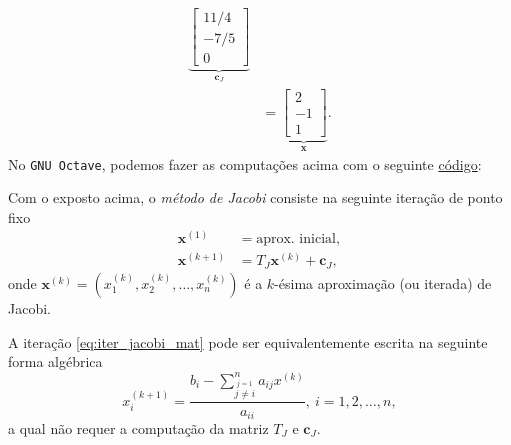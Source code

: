 \begin{ex}
\begin{align}
      \underbrace{\begin{bmatrix}
       11/4 \\
       -7/5 \\
       0
      \end{bmatrix}}_{\pmb{c}_J}\\
  &= \underbrace{\begin{bmatrix}
        2 \\
        -1 \\
        1             
      \end{bmatrix}}_{\pmb{x}}.
  \end{align}
\ifisoctave
No \verb+GNU Octave+, podemos fazer as computações acima com o seguinte \href{https://github.com/phkonzen/notas/blob/master/src/MatematicaNumerica/cap_sl_iter/dados/ex_jacobi_intro/ex_jacobi_intro.m}{código}:

\fi
\end{ex}

Com o exposto acima, o \emph{método de Jacobi} consiste na seguinte iteração de ponto fixo
\begin{align}
  \pmb{x}^{(1)} &= \text{aprox. inicial},\\
  \pmb{x}^{(k+1)} &= T_J\pmb{x}^{(k)} + \pmb{c}_J,\label{eq:iter_jacobi_mat}
\end{align}
onde $\pmb{x}^{(k)} = (x_1^{(k)}, x_2^{(k)}, \dotsc, x_n^{(k)})$ é a $k$-ésima aproximação (ou iterada) de Jacobi.

A iteração \eqref{eq:iter_jacobi_mat} pode ser equivalentemente escrita na seguinte forma algébrica
\begin{equation}
  x_i^{(k+1)} = \frac{{\displaystyle b_i - \sum_{\overset{j=1}{j\neq i}}^n a_{ij}x^{(k)}}}{a_{ii}},~i=1, 2, \dotsc, n,
\end{equation}
a qual não requer a computação da matriz $T_J$ e $\pmb{c}_J$.

